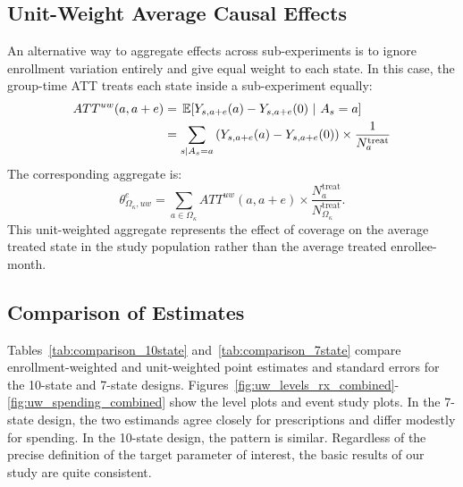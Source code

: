 \subsection{Unit-Weight Average Causal Effects}

An alternative way to aggregate effects across sub-experiments is to ignore enrollment variation entirely and give equal weight to each state. In this case, the group-time ATT treats each state inside a sub-experiment equally:
%
\begin{align*}
ATT^{uw}(a,a+e) &= \E{Y_{s,a+e}(a) - Y_{s,a+e}(0)}{A_s = a} \\
&= \sum_{s | A_s = a} \bp{Y_{s,a+e}(a) - Y_{s,a+e}(0)} \times \frac{1}{N_a^{\text{treat}}}
\end{align*}
%
The corresponding aggregate is:
%
\begin{equation*}
  \theta_{\Omega_{\kappa}, uw}^{e} = \sum_{a \in \Omega_{\kappa}} ATT^{uw}(a,a+e) \times \frac{N_a^{\text{treat}}}{N_{\Omega_{\kappa}}^{\text{treat}}}.
\end{equation*}
%
This unit-weighted aggregate represents the effect of coverage on the average treated state in the study population rather than the average treated enrollee-month.

\subsection{Comparison of Estimates}

Tables~\ref{tab:comparison_10state} and~\ref{tab:comparison_7state} compare enrollment-weighted and unit-weighted point estimates and standard errors for the 10-state and 7-state designs. Figures~\ref{fig:uw_levels_rx_combined}-\ref{fig:uw_spending_combined} show the level plots and event study plots. In the 7-state design, the two estimands agree closely for prescriptions and differ modestly for spending. In the 10-state design, the pattern is similar. Regardless of the precise definition of the target parameter of interest, the basic results of our study are quite consistent.



\FloatBarrier


\FloatBarrier


\FloatBarrier


\FloatBarrier


\FloatBarrier


\FloatBarrier
